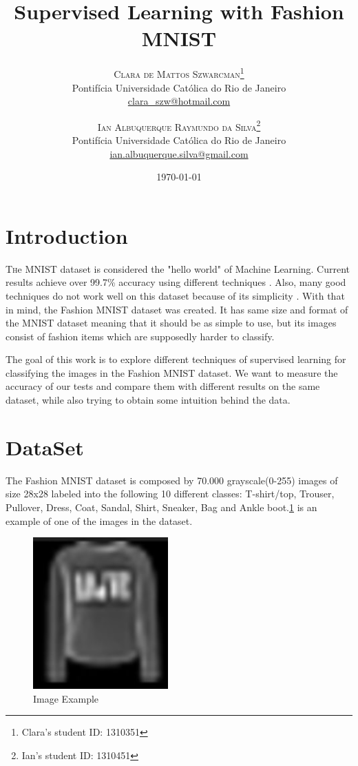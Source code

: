 \documentclass[twoside,twocolumn]{article}
\title{Supervised Learning with Fashion MNIST} %
\author{%
\textsc{Clara de Mattos Szwarcman}\thanks{Clara's student ID: 1310351} \\[1ex] %
\normalsize Pontifícia Universidade Católica do Rio de Janeiro \\ %
\normalsize \href{mailto:clara_szw@hotmail.com}{clara\_szw@hotmail.com} %
\and %
\textsc{Ian Albuquerque Raymundo da Silva}\thanks{Ian's student ID: 1310451} \\[1ex] %
\normalsize Pontifícia Universidade Católica do Rio de Janeiro \\ %
\normalsize \href{mailto:ian.albuquerque.silva@gmail.com}{ian.albuquerque.silva@gmail.com} %
}
\date{\today} %
\begin{document}
\maketitle


\section{Introduction}

\lettrine[nindent=0em,lines=3]{T} he MNIST dataset is considered the "hello world" of Machine Learning.
Current results achieve over 99.7\% accuracy using different techniques
\cite{LWan:2013dg} \cite{DCirean:2012dg} \cite{ISato:2015dg} \cite{JRChang:2015dg} \cite{CYLee:2015dg}.
Also, many good techniques do not work well on this dataset because of its simplicity \cite{CFran:2017dg}.
With that in mind, the Fashion MNIST dataset \cite{FashionMNIST} was created. It has same size and format
of the MNIST dataset meaning that
it should be as simple to use, but its images consist of fashion items which are supposedly harder to
classify.

The goal of this work is to explore different techniques of supervised learning for classifying the images
in the Fashion MNIST dataset. We want to measure the accuracy of our tests and compare them with different
results on the same dataset, while also trying to obtain some intuition behind the data.\


\section{DataSet}

	The Fashion MNIST dataset is composed by 70.000 grayscale(0-255) images of size 28x28 labeled into the following 10 different classes: T-shirt/top, Trouser, Pullover, Dress, Coat, Sandal, Shirt, Sneaker, Bag and Ankle boot.\ref{fig:fashionex} is an example of one of the images in the dataset.
	
	\begin{figure}[h]
    \begin{center}
        \includegraphics[scale=0.8]{fashionExample.png}
        \caption{Image Example\label{fig:fashionex}}
    \end{center}
    \end{figure}
    
\end{document}
